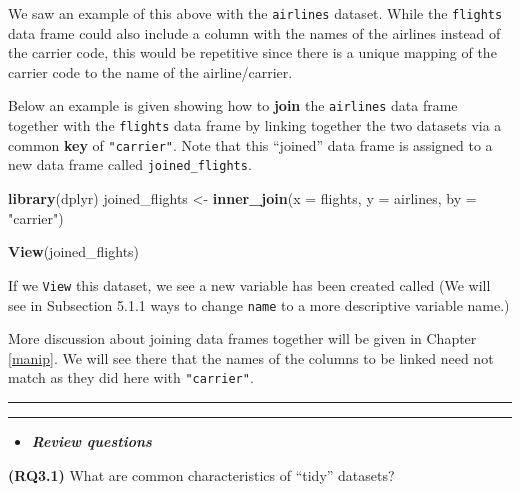\documentclass[]{tufte-book}
\newenvironment{Shaded}{\begin{snugshade}}{\end{snugshade}}
\newcommand{\KeywordTok}[1]{\textcolor[rgb]{0.13,0.29,0.53}{\textbf{{#1}}}}
\newcommand{\DataTypeTok}[1]{\textcolor[rgb]{0.13,0.29,0.53}{{#1}}}
\newcommand{\StringTok}[1]{\textcolor[rgb]{0.31,0.60,0.02}{{#1}}}
\newcommand{\NormalTok}[1]{{#1}}
\newenvironment{rmdblock}[1]
  {\begin{shaded*}
  \begin{itemize}
  \renewcommand{\labelitemi}{
    \raisebox{-.7\height}[0pt][0pt]{
    }
  }
  \item
  }
  {
  \end{itemize}
  \end{shaded*}
  }
\newenvironment{review}
  {\begin{rmdblock}{warning}}
  {\end{rmdblock}}
\begin{document}
We saw an example of this above with the \texttt{airlines} dataset.
While the \texttt{flights} data frame could also include a column with
the names of the airlines instead of the carrier code, this would be
repetitive since there is a unique mapping of the carrier code to the
name of the airline/carrier.

Below an example is given showing how to \textbf{join} the
\texttt{airlines} data frame together with the \texttt{flights} data
frame by linking together the two datasets via a common \textbf{key} of
\texttt{"carrier"}. Note that this ``joined'' data frame is assigned to
a new data frame called \texttt{joined\_flights}.

\begin{Shaded}
\begin{Highlighting}[]
\KeywordTok{library}\NormalTok{(dplyr)}
\NormalTok{joined_flights <-}\StringTok{ }\KeywordTok{inner_join}\NormalTok{(}\DataTypeTok{x =} \NormalTok{flights, }\DataTypeTok{y =} \NormalTok{airlines, }\DataTypeTok{by =} \StringTok{"carrier"}\NormalTok{)}
\end{Highlighting}
\end{Shaded}

\begin{Shaded}
\begin{Highlighting}[]
\KeywordTok{View}\NormalTok{(joined_flights)}
\end{Highlighting}
\end{Shaded}

If we \texttt{View} this dataset, we see a new variable has been created
called (We will see in Subsection 5.1.1 ways to change \texttt{name} to
a more descriptive variable name.)

More discussion about joining data frames together will be given in
Chapter \ref{manip}. We will see there that the names of the columns to
be linked need not match as they did here with \texttt{"carrier"}.

\begin{center}\rule{\linewidth}{\linethickness}\end{center}

\begin{center}\rule{\linewidth}{\linethickness}\end{center}

\begin{review}
\textbf{\emph{Review questions}}
\end{review}

\textbf{(RQ3.1)} What are common characteristics of ``tidy'' datasets?
\end{document}
